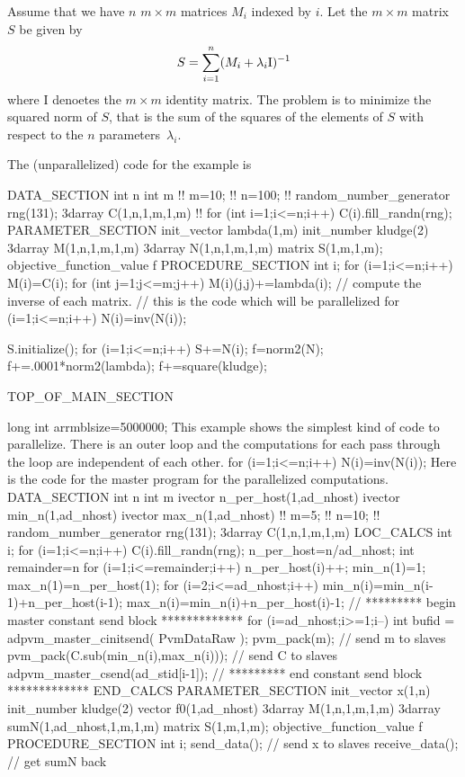 Assume that we have $n$ $m\times m$ matrices $M_i$ indexed by $i$.
Let the $m\times m$  matrix $S$ be given by
$$S=\sum_{i=1}^n (M_i+\lambda_i \hbox{\rm I})^{-1}$$
where I denoetes the $m\times m$ identity matrix.
The problem is to minimize the squared norm of $S$, that is the sum of the
squares of the elements of $S$ with respect to the $n$ parameters~$\lambda_i$.

The (unparallelized) code for the example is
\beginexample

DATA_SECTION
  int n
  int m
 !! m=10;
 !! n=100;
 !! random_number_generator rng(131);
  3darray C(1,n,1,m,1,m)
 !! for (int i=1;i<=n;i++) C(i).fill_randn(rng);
PARAMETER_SECTION
  init_vector lambda(1,m)
  init_number kludge(2)
  3darray M(1,n,1,m,1,m)
  3darray N(1,n,1,m,1,m)
  matrix S(1,m,1,m);
  objective_function_value f
PROCEDURE_SECTION
   int i;
   for (i=1;i<=n;i++)
   {
     M(i)=C(i);
     for (int j=1;j<=m;j++)
     {
       M(i)(j,j)+=lambda(i);
     }
   }
   // compute the inverse of each matrix. 
   // this is the code which will be parallelized
   for (i=1;i<=n;i++)
   {
     N(i)=inv(N(i));
   }

   S.initialize();
   for (i=1;i<=n;i++)
   {
     S+=N(i);
   }
   f=norm2(N);
   f+=.0001*norm2(lambda);
   f+=square(kludge);
  
TOP_OF_MAIN_SECTION
  
  long int arrmblsize=5000000;
\endexample
This example shows the simplest kind of code to parallelize.
There is an outer loop and the computations for each pass
through the loop are independent of each other.
\beginexample
   for (i=1;i<=n;i++)
   {
     N(i)=inv(N(i));
   }
\endexample
Here is the code for the master program for the parallelized computations.
\beginexample
DATA_SECTION
  int n
  int m
  ivector n_per_host(1,ad_nhost)
  ivector min_n(1,ad_nhost)
  ivector max_n(1,ad_nhost)
 !! m=5;
 !! n=10;
 !! random_number_generator rng(131);
  3darray C(1,n,1,m,1,m)
 LOC_CALCS
  int i;
  for (i=1;i<=n;i++) C(i).fill_randn(rng);
  n_per_host=n/ad_nhost;
  int remainder=n%
  for (i=1;i<=remainder;i++) n_per_host(i)++;
  min_n(1)=1;
  max_n(1)=n_per_host(1);
  for (i=2;i<=ad_nhost;i++) 
  {
    min_n(i)=min_n(i-1)+n_per_host(i-1);
    max_n(i)=min_n(i)+n_per_host(i)-1;
  }
  // *********  begin master constant send block  *************
  for (i=ad_nhost;i>=1;i--) 
  {
    int bufid = adpvm_master_cinitsend( PvmDataRaw );
    pvm_pack(m); // send m to slaves
    pvm_pack(C.sub(min_n(i),max_n(i))); // send C to slaves
    adpvm_master_csend(ad_stid[i-1]);
  }
  // *********  end constant send block  *************
 END_CALCS
PARAMETER_SECTION
  init_vector x(1,n)
  init_number kludge(2)
  vector f0(1,ad_nhost)
  3darray M(1,n,1,m,1,m)
  3darray sumN(1,ad_nhost,1,m,1,m)
  matrix S(1,m,1,m);
  objective_function_value f
PROCEDURE_SECTION
   int i;
   send_data(); // send x to slaves
   receive_data(); // get sumN back
   

